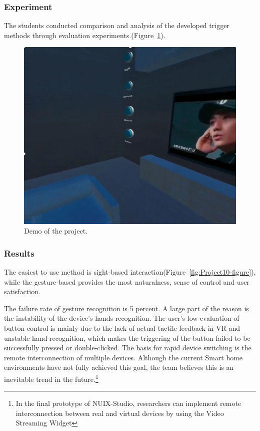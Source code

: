 \subsubsection{Experiment}

The students conducted comparison and analysis of the developed trigger methods through evaluation experiments.(Figure~\ref{fig:Project2-figure}).

\begin{figure}
  \centering
  \includegraphics[width=0.9\linewidth]{figures/Project_2.png}
  \caption{Demo of the project.}
  \label{fig:Project2-figure}
\end{figure}

\subsubsection{Results}

The easiest to use method is sight-based interaction(Figure~\ref{fig:Project10-figure}), while the gesture-based provides the most naturalness, sense of control and user satisfaction.

The failure rate of gesture recognition is 5 percent. A large part of the reason is the instability of the device's hands recognition.
The user's low evaluation of button control is mainly due to the lack of actual tactile feedback in VR and unstable hand recognition, which makes the triggering of the button failed to be successfully pressed or double-clicked.
The basis for rapid device switching is the remote interconnection of multiple devices. Although the current Smart home environments have not fully achieved this goal, the team believes this is an inevitable trend in the future.\footnote{In the final prototype of NUIX-Studio, researchers can implement remote interconnection between real and virtual devices by using the Video Streaming Widget}


